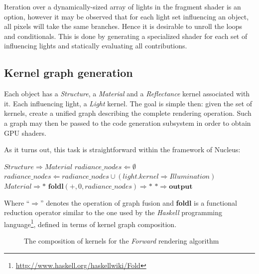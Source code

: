 Iteration over a dynamically-sized array of lights in the fragment shader is an option, however it may be observed that for each light set influencing an object, all pixels will take the same branches. Hence it is desirable to unroll the loops and conditionals. This is done by generating a specialized shader for each set of influencing lights and statically evaluating all contributions.

\subsection{Kernel graph generation}

Each object has a \emph{Structure}, a \emph{Material} and a \emph{Reflectance} kernel associated with it. Each influencing light, a \emph{Light} kernel. The goal is simple then: given the set of kernels, create a unified graph describing the complete rendering operation. Such a graph may then be passed to the code generation subsystem in order to obtain GPU shaders.

As it turns out, this task is straightforward within the framework of Nucleus:
	
\begin{algorithmic}
\STATE $Structure \Rightarrow Material$
\STATE $radiance\_nodes \Leftarrow \emptyset$
	\STATE $radiance\_nodes \Leftarrow radiance\_nodes \cup (light.kernel \Rightarrow Illumination)$
\ENDFOR
\STATE $Material \Rightarrow *$
\STATE $\textbf{foldl}(+, 0,radiance\_nodes) \Rightarrow *$
\STATE $* \Rightarrow \textbf{output}$
\end{algorithmic}

Where ``$\Rightarrow$'' denotes the operation of graph fusion and \textbf{foldl} is a functional reduction operator similar to the one used by the \emph{Haskell} programming language\footnote{\url{http://www.haskell.org/haskellwiki/Fold}}, defined in terms of kernel graph composition.

\begin{figure}[ht!]
  \centering
    \caption[Forward rendering graph]{The composition of kernels for the \emph{Forward} rendering algorithm}
  \label{fig:ForwardRenderingGraphSample}
\end{figure}

